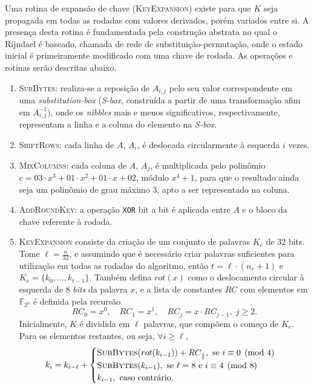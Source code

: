 \documentclass[12pt,notitlepage]{report}
\begin{document}
Uma rotina de expansão de chave (\textsc{KeyExpansion}) existe
para que $K$ seja propagada em todas as rodadas com valores derivados,
porém variados entre si. A presença desta rotina é fundamentada pela
construção abstrata no qual o Rijndael é baseado, chamada de rede de
substituição-permutação, onde o estado inicial é primeiramente modificado
com uma chave de rodada. As operações e rotinas serão descritas abaixo.

\begin{enumerate}[label=\roman*.]

  \item \textsc{SubBytes}: realiza-se a reposição de $A_{i,j}$ pelo seu valor
      correspondente em uma \emph{substitution-box} (\emph{S-box}, construída a
        partir de uma transformação afim em $A_{i,j}^{-1}$),
        onde os \emph{nibbles} mais e menos significativos,
        respectivamente, representam a linha e a coluna do elemento na
        \emph{S-box}.

  \item \textsc{ShiftRows}: cada linha de $A$, $A_i$, é deslocada circularmente
      à esquerda $i$ vezes.

  \item \textsc{MixColumns}: cada coluna de $A$, $A_j$, é multiplicada pelo
      polinômio $c = 03 \cdot x^{3} + 01 \cdot x^{2} + 01 \cdot x + 02$, módulo
        $x^{4} + 1$, para que o resultado ainda seja um polinômio de grau
        máximo 3, apto a ser representado na coluna.

  \item \textsc{AddRoundKey}: a operação \texttt{XOR} bit a bit é aplicada
      entre $A$ e o bloco da chave referente à rodada.

  \item \textsc{KeyExpansion} consiste da criação de um conjunto de palavras $K_e$ de
32 bits.  Tome $\ell = \frac{n}{32}$, e assumindo que é necessário criar
palavras suficientes para utilização em todas as rodadas do algoritmo, então $t
= \ell \cdot (n_r + 1)$ e $K_e = \{k_0, \dots, k_{t - 1}\}$. Também defina
$rot(x)$ como o deslocamento circular à esquerda de 8 \emph{bits} da palavra $x$, e a
lista de constantes $RC$ com elementos em $\mathbb{F}_{2^{8}}$ é definida pela
recursão 
\begin{equation}
RC_0 = x^0, \quad RC_1 = x^1, \quad RC_j = x \cdot RC_{j-1}, \; j \geq 2.
\end{equation}
Inicialmente, $K$ é dividida em $\ell$ palavras, que compõem o começo de $K_e$.
Para os elementos restantes, ou seja, $\forall i \geq \ell$,
\begin{equation}
  k_{i} = k_{i - \ell} + 
    \begin{cases}
      \textsc{SubBytes}(rot(k_{i - 1})) + RC_{\frac{i}{\ell}},
        \text{ se } i \equiv 0 \pmod{4} \\
      \textsc{SubBytes}(k_{i - 1}),
        \text{ se } \ell = 8 \text { e } i \equiv 4 \pmod{8} \\
      k_{i - 1}, \text{ caso contrário.}
    \end{cases}
\end{equation}
\end{enumerate}
\end{document}
